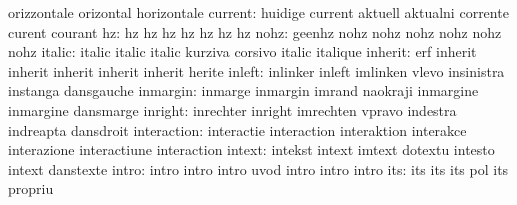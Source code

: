                            orizzontale               orizontal
                           horizontale
                  current: huidige                   current
                           aktuell                   aktualni
                           corrente                  curent
                           courant
                       hz: hz                        hz
                           hz                        hz
                           hz                        hz
                           hz
                     nohz: geenhz                    nohz
                           nohz                      nohz
                           nohz                      nohz
                           nohz
                   italic: italic                    italic
                           italic                    kurziva
                           corsivo                   italic
                           italique
                  inherit: erf                       inherit
                           inherit                   inherit
                           inherit                   inherit
                           herite
                   inleft: inlinker                  inleft
                           imlinken                  vlevo
                           insinistra                instanga
                           dansgauche
                 inmargin: inmarge                   inmargin
                           imrand                    naokraji
                           inmargine                 inmargine
                           dansmarge
                  inright: inrechter                 inright
                           imrechten                 vpravo
                           indestra                  indreapta
                           dansdroit
              interaction: interactie                interaction
                           interaktion               interakce
                           interazione               interactiune
                           interaction
                   intext: intekst                   intext
                           imtext                    dotextu
                           intesto                   intext
                           danstexte
                    intro: intro                     intro
                           intro                     uvod
                           intro                     intro
                           intro
                      its: its                       its
                           its                       pol
                           its                       propriu
